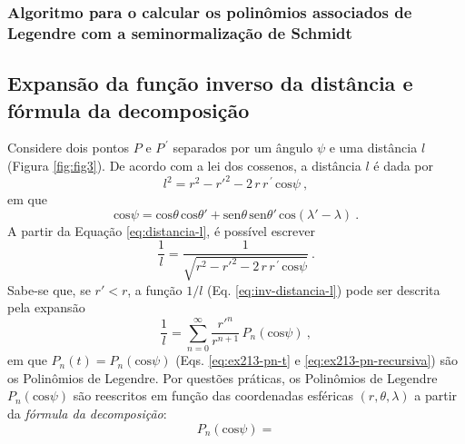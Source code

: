 \documentclass[10pt,a4paper,fleqn]{article}
\begin{document}
\subsubsection{Algoritmo para o calcular os polin\^{o}mios associados de Legendre 
com a seminormaliza\c{c}\~{a}o de Schmidt}

\bigskip

\subsection{Expans\~{a}o da fun\c{c}\~{a}o inverso da dist\^{a}ncia e f\'{o}rmula da decomposi\c{c}\~{a}o}

Considere dois pontos $P$ e $P^{\,\prime}$ separados por um ângulo $\psi$ e
uma distância $l$ (Figura \ref{fig:fig3}). De acordo com a lei dos cossenos,
a distância $l$ é dada por
\begin{equation}
l^{2} = r^{2} - r'^{2} - 2 \, r \, r^{\,\prime} \, \text{cos}\psi \: ,
\label{eq:distancia-l}
\end{equation}
em que
\begin{equation}
\text{cos}\psi = \text{cos}\theta \, \text{cos}\theta' + 
                 \text{sen}\theta \, \text{sen}\theta' \, \text{cos}(\lambda' - \lambda) \: .
\label{eq:cos-psi}
\end{equation}
A partir da Equa\c{c}ão \ref{eq:distancia-l}, é possível escrever
\begin{equation}
\dfrac{1}{l} = \dfrac{1}{\sqrt{r^{2} - r'^{2} - 2 \, r \, r^{\,\prime} \, \text{cos}\psi}} \: .
\label{eq:inv-distancia-l}
\end{equation}
Sabe-se que, se $r' < r$, a fun\c{c}ão $1/l$ (Eq. \ref{eq:inv-distancia-l}) pode
ser descrita pela expansão
\begin{equation}
\dfrac{1}{l} = \sum_{n=0}^{\infty} \dfrac{r'^{n}}{r^{n+1}} \, P_{n}(\text{cos}\psi) \: ,
\label{eq:inv-distancia-l-Pn}
\end{equation}
em que $P_{n}(t) = P_{n}(\text{cos}\psi)$ (Eqs. \ref{eq:ex213-pn-t} e \ref{eq:ex213-pn-recursiva})
são os Polinômios de Legendre. Por questões práticas, os Polinômios de Legendre 
$P_{n}(\text{cos}\psi)$ são reescritos em fun\c{c}ão das coordenadas esféricas 
$(r, \theta, \lambda)$ a partir da \textit{fórmula da decomposi\c{c}ão}:
\begin{equation}
P_{n}(\text{cos}\psi) = 
\label{eq:formula-decomposicao}
\end{equation}
\end{document}
